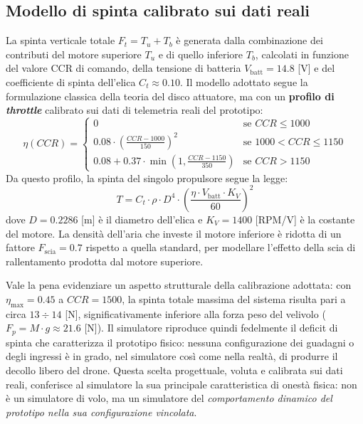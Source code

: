 \documentclass[11pt]{report}
\begin{document}
	\subsection{Modello di spinta calibrato sui dati reali}
	La spinta verticale totale $F_t = T_u + T_b$ è generata dalla combinazione dei contributi del motore superiore $T_u$ e di quello inferiore $T_b$, calcolati in funzione del valore CCR di comando, della tensione di batteria $V_\text{batt} = 14.8$ [V] e del coefficiente di spinta dell'elica $C_t \approx 0.10$. Il modello adottato segue la formulazione classica della teoria del disco attuatore, ma con un \textbf{profilo di \textit{throttle}} calibrato sui dati di telemetria reali del prototipo:
	\begin{equation}
		\eta(CCR) =
		\begin{cases}
			0 & \text{se } CCR \leq 1000 \\
			0.08 \cdot \left( \frac{CCR-1000}{150} \right)^2 & \text{se } 1000 < CCR \leq 1150 \\
			0.08 + 0.37 \cdot \min\!\left( 1, \frac{CCR-1150}{350} \right) & \text{se } CCR > 1150
		\end{cases}
		\label{eq:profilo_throttle}
	\end{equation}
	Da questo profilo, la spinta del singolo propulsore segue la legge:
	\begin{equation}
		T = C_t \cdot \rho \cdot D^4 \cdot \left( \frac{\eta \cdot V_\text{batt} \cdot K_V}{60} \right)^2
		\label{eq:spinta_motore}
	\end{equation}
	dove $D = 0.2286$ [m] è il diametro dell'elica e $K_V = 1400$ [RPM/V] è la costante del motore. La densità dell'aria che investe il motore inferiore è ridotta di un fattore $F_\text{scia} = 0.7$ rispetto a quella standard, per modellare l'effetto della scia di rallentamento prodotta dal motore superiore.
	
	Vale la pena evidenziare un aspetto strutturale della calibrazione adottata: con $\eta_\text{max} = 0.45$ a $CCR = 1500$, la spinta totale massima del sistema risulta pari a circa $13 \div 14$ [N], significativamente inferiore alla forza peso del velivolo ($F_p = M \cdot g \approx 21.6$ [N]). Il simulatore riproduce quindi fedelmente il deficit di spinta che caratterizza il prototipo fisico: nessuna configurazione dei guadagni o degli ingressi è in grado, nel simulatore così come nella realtà, di produrre il decollo libero del drone. Questa scelta progettuale, voluta e calibrata sui dati reali, conferisce al simulatore la sua principale caratteristica di onestà fisica: non è un simulatore di volo, ma un simulatore del \textit{comportamento dinamico del prototipo nella sua configurazione vincolata}.
	
\end{document}
